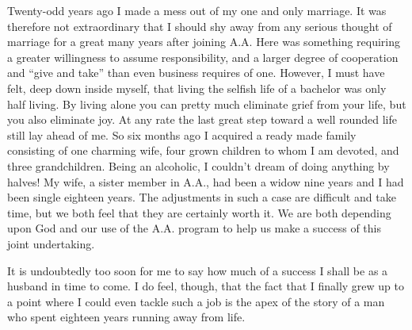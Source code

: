 \begin{biblechapter}
Twenty-odd years ago I made a mess out of my one and only marriage. It was therefore not extraordinary that I should shy away from any serious thought of marriage for a great many years after joining A.A. Here was something requiring a greater willingness to assume responsibility, and a larger degree of cooperation and “give and take” than even business requires of one. However, I must have felt, deep down inside myself, that living the selfish life of a bachelor was only half living. By living alone you can pretty much eliminate grief from your life, but you also eliminate joy. At any rate the last great step toward a well rounded life still lay ahead of me. So six months ago I acquired a ready made family consisting of one charming wife, four grown children to whom I am devoted, and three grandchildren. Being an alcoholic, I couldn’t dream of doing anything by halves! My wife, a sister member in A.A., had been a widow nine years and I had been single eighteen years. The adjustments in such a case are difficult and take time, but we both feel that they are certainly worth it. We are both depending upon God and our use of the A.A. program to help us make a success of this joint undertaking.

It is undoubtedly too soon for me to say how much of a success I shall be as a husband in time to come. I do feel, though, that the fact that I finally grew up to a point where I could even tackle such a job is the apex of the story of a man who spent eighteen years running away from life.
\end{biblechapter}
